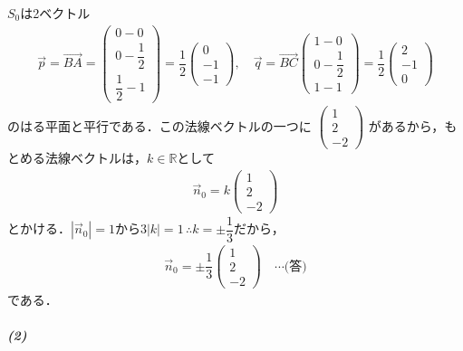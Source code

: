 \documentclass[../../main.tex]{subfiles}
\begin{document}
$S_0$は2ベクトル
\begin{align}
  \vec{p} = \overrightarrow{BA} =
  \begin{pmatrix}0-0\\0-\dfrac{1}{2}\\\dfrac{1}{2}-1
  \end{pmatrix} = \dfrac{1}{2}
  \begin{pmatrix}0\\-1\\-1
  \end{pmatrix}, \quad
  \vec{q} = \overrightarrow{BC}
  \begin{pmatrix}1-0\\0-\dfrac{1}{2}\\1-1
  \end{pmatrix} = \dfrac{1}{2}
  \begin{pmatrix}2\\-1\\0
  \end{pmatrix}
\end{align}
のはる平面と平行である．この法線ベクトルの一つに
$
\begin{pmatrix}1\\2\\-2
\end{pmatrix}$
があるから，もとめる法線ベクトルは，$k\in\mathbb{R}$として
\begin{align}
  \vec{n}_0 = k
  \begin{pmatrix}1\\2\\-2
  \end{pmatrix}
\end{align}
とかける．$|\vec{n}_0|=1$から$3|k|=1\, \therefore k=\pm\dfrac{1}{3}$だから，
\begin{align}
  \vec{n}_0 = \pm\dfrac{1}{3}
  \begin{pmatrix}1\\2\\-2
  \end{pmatrix} \quad \cdots\text{(答)} \label{eq:1}
\end{align}
である．

\subparagraph{(2)}
\end{document}
